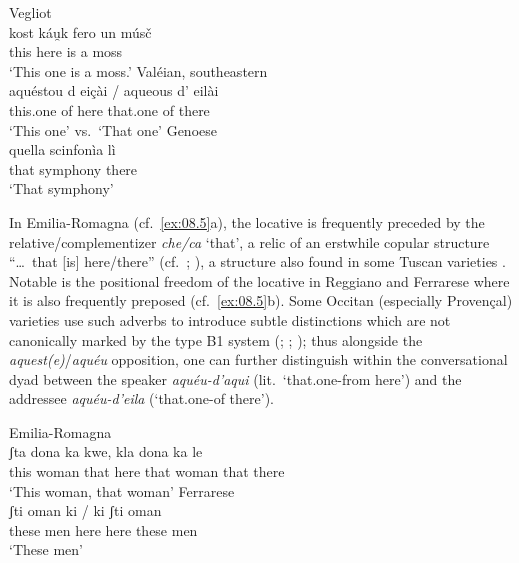 \documentclass[output=paper]{langsci/langscibook}
\begin{document}
\ea\label{bkm:Ref370498282}\label{ex:08.4}
\ea     Vegliot \citep{Bartoli:1906a}\\
\gll   kost  káu̯k  fero  un  músč\\
this  here  is  a  moss\\
\glt \enquote*{This one is a moss.}
\ex Valéian, southeastern  \citep{Arnaud:1920a}\\
\gll     aquéstou  d  eiçài \textup{\quad /\quad}  aqueous  d’  eilài\\
this.one  of  here {} that.one  of  there\\
\glt \enquote*{This one} vs.\ \enquote*{That one}
\ex Genoese \citep{Forner:1997a}\\
\gll    quella scinfonìa lì\\
that symphony there\\
\glt    \enquote*{That symphony}\\
\z
\z

In Emilia-Romagna (cf.\ \ref{ex:08.5}a), the locative is frequently
preceded by the relative/complementizer \emph{che/ca} ‘that’, a relic of an
erstwhile copular structure \enquote{\dots{}~that [is] here/there}
(cf.\ \citealt[206]{Rohlfs:1968a}; \citealt[581]{Foresti:1988a}), a structure
also found in some Tuscan varieties \citep[203]{Rohlfs:1968a}. Notable is the
positional freedom of the locative in Reggiano and Ferrarese where it is also
frequently preposed (cf.\ \ref{ex:08.5}b). Some Occitan (especially
Provençal) varieties use such adverbs to introduce subtle distinctions which
are not canonically marked by the type B1 system
(\citealt[88f]{Koschwitz:1894a}; \citealt[33]{Ronjat:1913a};
\citealt[65]{Salvat:1998a}); thus alongside the \emph{aquest(e)}/\emph{aquéu}
opposition, one can further distinguish within the conversational dyad between
the speaker \emph{aquéu-d’aqui} (lit.\ ‘that.one-from here’) and the addressee
\emph{aquéu-d’eila} (‘that.one-of there’).

\ea\label{bkm:Ref370498313}\label{ex:08.5}
\ea Emilia-Romagna \citep{Foresti:1988a}\\
\gll   ʃta  dona  ka  kwe,  kla  dona  ka  le\\
this  woman  that  here  that  woman  that  there\\
\glt \enquote*{This woman, that woman}
\ex Ferrarese \citep{Foresti:1988a}\\
\gll     ʃti  oman  ki   /  ki  ʃti  oman\\
these  men  here {} here  these  men\\
\glt \enquote*{These men}\z
\z
\end{document}
